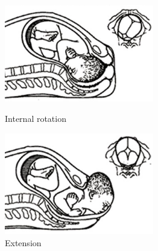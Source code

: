 \begin{enumerate}
\begin{figure}
\begin{minipage}[t]{6cm}
\begin{center}
\includegraphics[width=65mm]{sections/introduction/images/InternalRotation.png}
\caption{\label{intRotFig} Internal rotation}
\end{center}
\end{minipage}
\hfill
\begin{minipage}[t]{6cm}
\begin{center}
\includegraphics[width=65mm]{sections/introduction/images/Completeextension.png}
\caption[Descent and flexion]{\label{Descent} Extension}
\end{center}
\end{minipage}
\end{figure}


\end{enumerate}
